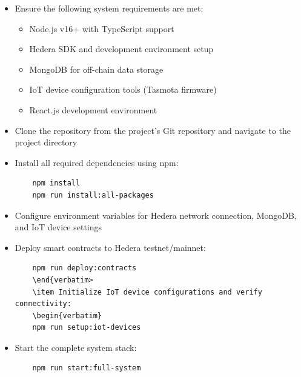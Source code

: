 \documentclass[oneside,a4paper,12pt]{book}
\begin{document}
\begin{itemize}
    \item Ensure the following system requirements are met:
    \begin{itemize}
        \item Node.js v16+ with TypeScript support
        \item Hedera SDK and development environment setup
        \item MongoDB for off-chain data storage
        \item IoT device configuration tools (Tasmota firmware)
        \item React.js development environment
    \end{itemize}
    
    \item Clone the repository from the project's Git repository and navigate to the project directory
    \item Install all required dependencies using npm:
    \begin{verbatim}
    npm install
    npm run install:all-packages
    \end{verbatim}
    \item Configure environment variables for Hedera network connection, MongoDB, and IoT device settings
    \item Deploy smart contracts to Hedera testnet/mainnet:
    \begin{verbatim}
    npm run deploy:contracts
    \end{verbatim>
    \item Initialize IoT device configurations and verify connectivity:
    \begin{verbatim}
    npm run setup:iot-devices
    \end{verbatim}
    \item Start the complete system stack:
    \begin{verbatim}
    npm run start:full-system
    \end{verbatim}
\end{itemize}
\end{document}
